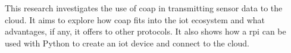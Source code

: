 This research investigates the use of \gls{coap} in transmitting sensor data
to the cloud. It aims to explore how \gls{coap} fits into the \gls{iot} ecosystem and
what advantages, if any, it offers to other protocols. It also shows how a \gls{rpi} can
be used with Python to create an \gls{iot} device and connect to the cloud. 